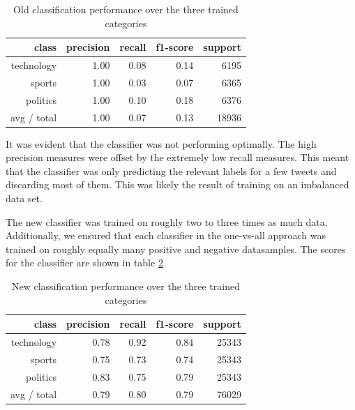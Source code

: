 \documentclass{llncs}
\begin{document}
\begin{table}
	\begin{center}
		\begin{tabular}{|r|r|r|r|r|} \hline
			class  & precision   & recall & f1-score  & support \\ \hline
			technology    &   1.00 &     0.08  &    0.14   &   6195 \\
			sports   &    1.00   &   0.03   &   0.07   &   6365 \\
			politics   &    1.00  &    0.10   &   0.18   &   6376 \\
			avg / total  &     1.00   &   0.07  &    0.13   &  18936 \\ \hline
		\end{tabular}
	\end{center}
	\caption{Old classification performance over the three trained categories}
	\label{tbl:oldclassifier}
\end{table}

It was evident that the classifier was not performing optimally. The high precision measures were offset by the extremely low recall measures. This meant that the classifier was only predicting the relevant labels for a few tweets and discarding most of them. This was likely the result of training on an imbalanced data set.

The new classifier was trained on roughly two to three times as much data. Additionally, we ensured that each classifier in the one-vs-all approach was trained on roughly equally many positive and negative datasamples. The scores for the classifier are shown in table \ref{tbl:newclassifier}

\begin{table}
	\begin{center}
		\begin{tabular}{|r|r|r|r|r|} \hline
			class  & precision   & recall & f1-score  & support \\ \hline
			technology    &   0.78 &     0.92  &    0.84   &  25343 \\
			sports   &    0.75   &   0.73   &   0.74   &   25343 \\
			politics   &    0.83  &    0.75   &   0.79   &   25343 \\
			avg / total  &     0.79   &   0.80  &    0.79   &  76029 \\ \hline
		\end{tabular}
	\end{center}
	\caption{New classification performance over the three trained categories}
	\label{tbl:newclassifier}
\end{table}
\end{document}
